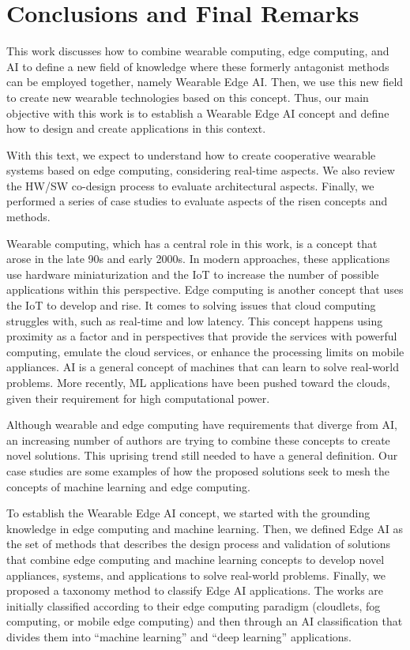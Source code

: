 \chapter{Conclusions and Final Remarks}
\label{chap:conclusions}

This work discusses how to combine wearable computing, edge computing, and AI to define a new field of knowledge where these formerly antagonist methods can be employed together, namely Wearable Edge AI. Then, we use this new field to create new wearable technologies based on this concept. Thus, our main objective with this work is to establish a Wearable Edge AI concept and define how to design and create applications in this context. 

With this text, we expect to understand how to create cooperative wearable systems based on edge computing, considering real-time aspects. We also review the HW/SW co-design process to evaluate architectural aspects. Finally, we performed a series of case studies to evaluate aspects of the risen concepts and methods.

Wearable computing, which has a central role in this work, is a concept that arose in the late 90s and early 2000s. In modern approaches, these applications use hardware miniaturization and the IoT to increase the number of possible applications within this perspective. Edge computing is another concept that uses the IoT to develop and rise. It comes to solving issues that cloud computing struggles with, such as real-time and low latency. This concept happens using proximity as a factor and in perspectives that provide the services with powerful computing, emulate the cloud services, or enhance the processing limits on mobile appliances. AI is a general concept of machines that can learn to solve real-world problems. More recently, ML applications have been pushed toward the clouds, given their requirement for high computational power.

Although wearable and edge computing have requirements that diverge from AI, an increasing number of authors are trying to combine these concepts to create novel solutions. This uprising trend still needed to have a general definition. Our case studies are some examples of how the proposed solutions seek to mesh the concepts of machine learning and edge computing.

To establish the Wearable Edge AI concept, we started with the grounding knowledge in edge computing and machine learning. Then, we defined Edge AI as the set of methods that describes the design process and validation of solutions that combine edge computing and machine learning concepts to develop novel appliances, systems, and applications to solve real-world problems. Finally, we proposed a taxonomy method to classify Edge AI applications. The works are initially classified according to their edge computing paradigm (cloudlets, fog computing, or mobile edge computing) and then through an AI classification that divides them into ``machine learning'' and ``deep learning'' applications. 


